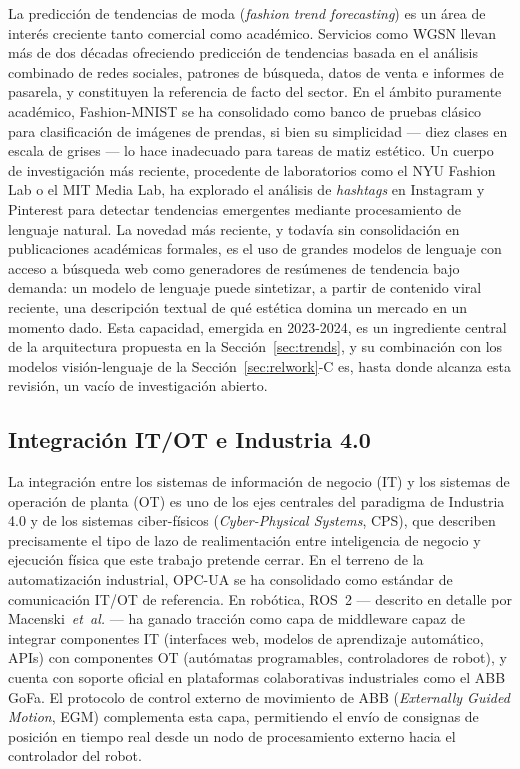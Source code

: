 \documentclass[conference]{IEEEtran}
\begin{document}
La predicción de tendencias de moda (\emph{fashion trend forecasting}) es un
área de interés creciente tanto comercial como académico. Servicios como
WGSN llevan más de dos décadas ofreciendo predicción de tendencias basada en
el análisis combinado de redes sociales, patrones de búsqueda, datos de
venta e informes de pasarela, y constituyen la referencia de facto del
sector. En el ámbito puramente académico, Fashion-MNIST
\cite{xiao2017fashionmnist} se ha consolidado como banco de pruebas clásico
para clasificación de imágenes de prendas, si bien su simplicidad --- diez
clases en escala de grises --- lo hace inadecuado para tareas de matiz
estético. Un cuerpo de investigación más reciente, procedente de
laboratorios como el NYU Fashion Lab o el MIT Media Lab, ha explorado el
análisis de \emph{hashtags} en Instagram y Pinterest para detectar
tendencias emergentes mediante procesamiento de lenguaje natural. La novedad
más reciente, y todavía sin consolidación en publicaciones académicas
formales, es el uso de grandes modelos de lenguaje con acceso a búsqueda web
como generadores de resúmenes de tendencia bajo demanda: un modelo de
lenguaje puede sintetizar, a partir de contenido viral reciente, una
descripción textual de qué estética domina un mercado en un momento dado.
Esta capacidad, emergida en 2023-2024, es un ingrediente central de la
arquitectura propuesta en la Sección~\ref{sec:trends}, y su combinación con
los modelos visión-lenguaje de la Sección~\ref{sec:relwork}-C es, hasta donde
alcanza esta revisión, un vacío de investigación abierto.

\subsection{Integración IT/OT e Industria 4.0}

La integración entre los sistemas de información de negocio (IT) y los
sistemas de operación de planta (OT) es uno de los ejes centrales del
paradigma de Industria 4.0 y de los sistemas ciber-físicos
(\emph{Cyber-Physical Systems}, CPS), que describen precisamente el tipo de
lazo de realimentación entre inteligencia de negocio y ejecución física que
este trabajo pretende cerrar. En el terreno de la automatización industrial,
OPC-UA se ha consolidado como estándar de comunicación IT/OT de referencia.
En robótica, ROS~2 --- descrito en detalle por Macenski~\emph{et~al.}
\cite{macenski2022ros2} --- ha ganado tracción como capa de middleware capaz
de integrar componentes IT (interfaces web, modelos de aprendizaje
automático, APIs) con componentes OT (autómatas programables, controladores
de robot), y cuenta con soporte oficial en plataformas colaborativas
industriales como el ABB GoFa. El protocolo de control externo de movimiento
de ABB (\emph{Externally Guided Motion}, EGM) complementa esta capa,
permitiendo el envío de consignas de posición en tiempo real desde un nodo
de procesamiento externo hacia el controlador del robot.
\end{document}
